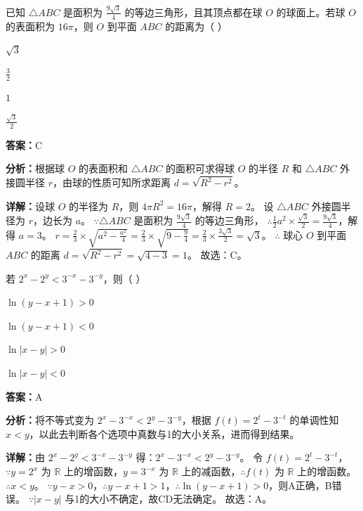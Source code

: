 \begin{question}[points=5]
已知 $\triangle ABC$ 是面积为 $\frac{9\sqrt{3}}{4}$ 的等边三角形，且其顶点都在球 $O$ 的球面上。若球 $O$ 的表面积为 $16\pi$，则 $O$ 到平面 $ABC$ 的距离为（ ）
\begin{choices}
  \item $\sqrt{3}$
  \item $\frac{3}{2}$
  \item $1$
  \item $\frac{\sqrt{3}}{2}$
\end{choices}
\begin{solution}
\textbf{答案：}C

\textbf{分析：}根据球 $O$ 的表面积和 $\triangle ABC$ 的面积可求得球 $O$ 的半径 $R$ 和 $\triangle ABC$ 外接圆半径 $r$，由球的性质可知所求距离 $d=\sqrt{R^2-r^2}$。

\textbf{详解：}设球 $O$ 的半径为 $R$，则 $4\pi R^2=16\pi$，解得 $R=2$。
设 $\triangle ABC$ 外接圆半径为 $r$，边长为 $a$。
$\because \triangle ABC$ 是面积为 $\frac{9\sqrt{3}}{4}$ 的等边三角形，
$\therefore \frac{1}{2}a^2\times\frac{\sqrt{3}}{2} = \frac{9\sqrt{3}}{4}$，解得 $a=3$。
$r = \frac{2}{3}\times\sqrt{a^2-\frac{a^2}{4}} = \frac{2}{3}\times\sqrt{9-\frac{9}{4}} = \frac{2}{3}\times\frac{3\sqrt{3}}{2} = \sqrt{3}$。
$\therefore$ 球心 $O$ 到平面 $ABC$ 的距离 $d = \sqrt{R^2-r^2} = \sqrt{4-3} = 1$。
故选：C。
\end{solution}
\end{question}

\begin{question}[points=5]
若 $2^x-2^y < 3^{-x}-3^{-y}$，则（ ）
\begin{choices}
  \item $\ln(y-x+1)>0$
  \item $\ln(y-x+1)<0$
  \item $\ln|x-y|>0$
  \item $\ln|x-y|<0$
\end{choices}
\begin{solution}
\textbf{答案：}A

\textbf{分析：}将不等式变为 $2^x-3^{-x}<2^y-3^{-y}$，根据 $f(t)=2^t-3^{-t}$ 的单调性知 $x<y$，以此去判断各个选项中真数与1的大小关系，进而得到结果。

\textbf{详解：}由 $2^x-2^y < 3^{-x}-3^{-y}$ 得：$2^x-3^{-x} < 2^y-3^{-y}$。
令 $f(t)=2^t-3^{-t}$，$\because y=2^x$ 为 $\mathbb{R}$ 上的增函数，$y=3^{-x}$ 为 $\mathbb{R}$ 上的减函数，$\therefore f(t)$ 为 $\mathbb{R}$ 上的增函数。
$\therefore x<y$。
$\because y-x>0$，$\therefore y-x+1>1$，$\therefore \ln(y-x+1)>0$，则A正确，B错误。
$\because |x-y|$ 与1的大小不确定，故CD无法确定。
故选：A。
\end{solution}
\end{question}

